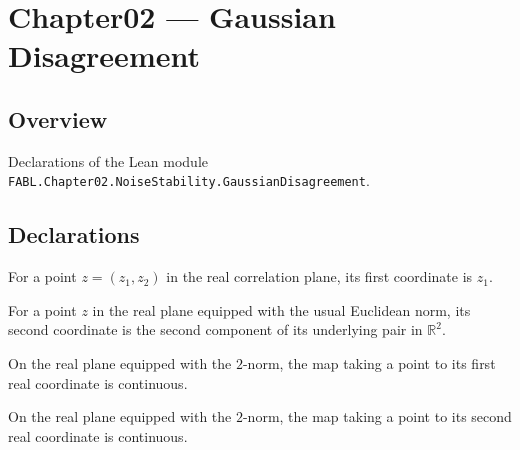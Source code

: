 \chapter{Chapter02 — Gaussian Disagreement}
\section{Overview}

Declarations of the Lean module \texttt{FABL.Chapter02.NoiseStability.GaussianDisagreement}.

\section{Declarations}

\begin{definition}
\label{FABL.correlationFirstCoordinate}
\leanok
{}
For a point $z=(z_1,z_2)$ in the real correlation plane, its first coordinate is $z_1$.
\end{definition}

\begin{definition}
\label{FABL.correlationSecondCoordinate}
\leanok
{}
For a point $z$ in the real plane equipped with the usual Euclidean norm, its second
coordinate is the second component of its underlying pair in $\mathbb{R}^2$.
\end{definition}

\begin{theorem}
\label{FABL.continuous_correlationFirstCoordinate}
\leanok
{}
On the real plane equipped with the $2$-norm, the map taking a point to its first real
coordinate is continuous.
\end{theorem}

\begin{theorem}
\label{FABL.continuous_correlationSecondCoordinate}
\leanok
{}
On the real plane equipped with the $2$-norm, the map taking a point to its second real
coordinate is continuous.
\end{theorem}

